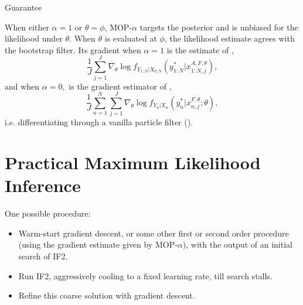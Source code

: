 \documentclass{beamer}
\begin{document}
\begin{frame}{Guarantee}
    \begin{prop}
    \label{prop:mop-correctness}
    When either $\alpha=1$ or $\theta=\phi$, MOP-$\alpha$ targets the posterior and is unbiased for the likelihood under $\theta$. 
    When $\theta$ is evaluated at $\phi$, the likelihood estimate agrees with the bootstrap filter. Its gradient when $\alpha=1$ is the estimate of \citet{poyiadjis11},
    $$\frac{1}{J}\sum_{j=1}^J \nabla_\theta \log f_{Y_{1:N}|X_{0:N}}(y_{1:N}^*|x_{1:N,j}^{A, F,\theta}),$$
    and when $\alpha=0,$ is the gradient estimator of \cite{blei2018vsmc},
    $$
        \frac{1}{J} \sum_{n=1}^N \sum_{j=1}^J \nabla_\theta \log f_{Y_n|X_{n}}(y_n^*|x_{n,j}^{F, \theta}; \theta),
    $$
    i.e. differentiating through a vanilla particle filter (\cite{scibior21}).
\end{prop}
\end{frame}



\section{Practical Maximum Likelihood Inference}

\begin{frame}{One possible procedure:}
    \begin{itemize}
        \item Warm-start gradient descent, or some other first or second order procedure (using the gradient estimate given by MOP-$\alpha$), with the output of an initial search of IF2. 
        \item \pause Run IF2, aggressively cooling to a fixed learning rate, till search stalls.
        \item \pause Refine this coarse solution with gradient descent.
    \end{itemize}
    \pause
\end{frame}
\end{document}
